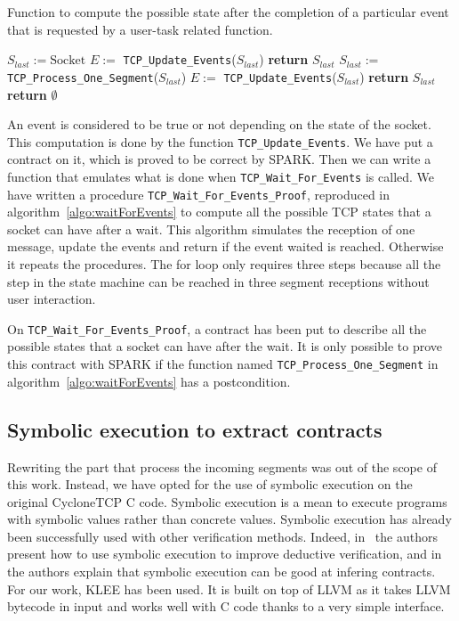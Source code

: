 \documentclass[conference]{IEEEtran}
\def\spark#1{\lstinline[language=Ada]{#1}}
\begin{document}
\begin{algorithm}[t]
    \caption{Function to compute the possible state after the completion of a
particular event that is requested by a user-task related function.}
\label{algo:waitForEvents}
\begin{algorithmic}[1]
\footnotesize
{}
    \State $S_{last} := \text{Socket}$
    \State $E :=$ \spark{TCP_Update_Events}($S_{last}$)
        \State \textbf{return}  $S_{last}$
    \EndIf
        \State $S_{last} :=$ \spark{TCP_Process_One_Segment}($S_{last}$)
        \State $E :=$ \spark{TCP_Update_Events}($S_{last}$)
            \State \textbf{return} $S_{last}$
        \EndIf
    \EndFor
    \State \textbf{return} $\emptyset$
\EndFunction
\end{algorithmic}
\end{algorithm}

An event is considered to be true or not depending on the state of the socket.
This computation is done by the function \spark{TCP_Update_Events}. We have put
a contract on it, which is proved to be correct by SPARK. Then we can write a
function that emulates what is done when \spark{TCP_Wait_For_Events} is called.
We have written a procedure \spark{TCP_Wait_For_Events_Proof}, reproduced in
algorithm~\ref{algo:waitForEvents} to compute all the possible TCP states that a
socket can have after a wait. This algorithm simulates the reception of
one message, update the events and return if the event waited is reached.
Otherwise it repeats the procedures. The for loop only requires three steps
because all the step in the state machine can be reached in three segment
receptions without user interaction.

On \spark{TCP_Wait_For_Events_Proof}, a contract has been put to describe all
the possible states that a socket can have after the wait. It is only possible
to prove this contract with SPARK if the function named
\spark{TCP_Process_One_Segment} in algorithm~\ref{algo:waitForEvents}
has a postcondition.

\subsection{Symbolic execution to extract contracts}

Rewriting the part that process the incoming segments was out of the scope of
this work. Instead, we have opted for the use of symbolic execution on the
original CycloneTCP C code.
Symbolic execution is a mean to execute programs with symbolic values rather
than concrete values. Symbolic execution has already been successfully
used with other verification methods.
Indeed, in~\cite{vanoverberghe2008using} the authors present how to use symbolic
execution to improve deductive verification, and in~\cite{kassios2012comparing}
the authors explain that symbolic execution can be good at infering contracts.
For our work, KLEE has been used. It is built on top of LLVM as it takes LLVM
bytecode in input and works well with C code thanks to a very simple interface.
\end{document}
